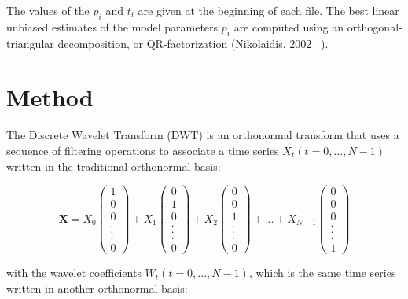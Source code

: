 \documentclass[main.tex]{subfiles}
\begin{document}
The values of the $p_i$ and $t_i$ are given at the beginning of each file. The best linear unbiased estimates of the model parameters $p_i$ are computed using an orthogonal-triangular decomposition, or QR-factorization (Nikolaidis, 2002 ~\cite{NIK_2002}).

\chapter{Method}

The Discrete Wavelet Transform (DWT) is an orthonormal transform that uses a sequence of filtering operations to associate a time series $X_t (t = 0 , ... , N - 1)$ written in the traditional orthonormal basis:

\begin{equation}
\bm{X} = X_0 \begin{pmatrix} 1 \\ 0 \\ 0 \\ . \\ . \\ . \\ 0 \end{pmatrix}
+ X_1 \begin{pmatrix} 0 \\ 1 \\ 0 \\ . \\ . \\ . \\ 0 \end{pmatrix}
+ X_2 \begin{pmatrix} 0 \\ 0 \\ 1 \\ . \\ . \\ . \\ 0 \end{pmatrix}
+ ... + X_{N - 1} \begin{pmatrix} 0 \\ 0 \\ 0 \\ . \\ . \\ . \\ 1 \end{pmatrix}
\end{equation}

with the wavelet coefficients $W_t (t = 0 , ... , N - 1)$, which is the same time series written in another orthonormal basis:
\end{document}
